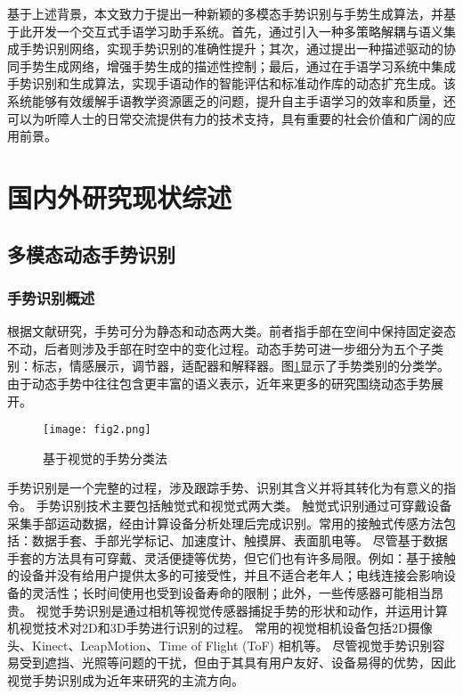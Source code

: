 基于上述背景，本文致力于提出一种新颖的多模态手势识别与手势生成算法，并基于此开发一个交互式手语学习助手系统。首先，通过引入一种多策略解耦与语义集成手势识别网络，实现手势识别的准确性提升；其次，通过提出一种描述驱动的协同手势生成网络，增强手势生成的描述性控制；最后，通过在手语学习系统中集成手势识别和生成算法，实现手语动作的智能评估和标准动作库的动态扩充生成。该系统能够有效缓解手语教学资源匮乏的问题，提升自主手语学习的效率和质量，还可以为听障人士的日常交流提供有力的技术支持，具有重要的社会价值和广阔的应用前景。



\section{国内外研究现状综述}
\subsection{多模态动态手势识别}
\subsubsection{手势识别概述}
根据文献研究\cite{kaaniche2009gesture, rautaray2015vision}，手势可分为静态和动态两大类。前者指手部在空间中保持固定姿态不动，后者则涉及手部在时空中的变化过程。动态手势可进一步细分为五个子类别\cite{ottenheimer2018anthropology}：标志，情感展示，调节器，适配器和解释器。图\ref{fig:gesture_taxonomies}显示了手势类别的分类学。由于动态手势中往往包含更丰富的语义表示，近年来更多的研究围绕动态手势展开。
\begin{figure}
  \centering
  \texttt{[image: fig2.png]}
  \caption{基于视觉的手势分类法\cite{rautaray2015vision}}
  \label{fig:gesture_taxonomies}
\end{figure}

手势识别是一个完整的过程，涉及跟踪手势、识别其含义并将其转化为有意义的指令\cite{rautaray2015vision}。
手势识别技术主要包括触觉式和视觉式两大类\cite{oudah2020hand,rautaray2015vision}。
触觉式识别通过可穿戴设备采集手部运动数据，经由计算设备分析处理后完成识别。常用的接触式传感方法包括：数据手套、手部光学标记、加速度计、触摸屏、表面肌电等\cite{oudah2020hand}。
尽管基于数据手套的方法具有可穿戴、灵活便捷等优势，但它们也有许多局限。例如：基于接触的设备并没有给用户提供太多的可接受性\cite{rautaray2015vision}，并且不适合老年人；电线连接会影响设备的灵活性；长时间使用也受到设备寿命的限制；此外，一些传感器可能相当昂贵\cite{oudah2020hand}。
视觉手势识别是通过相机等视觉传感器捕捉手势的形状和动作，并运用计算机视觉技术对2D和3D手势进行识别的过程。
常用的视觉相机设备包括2D摄像头、Kinect、LeapMotion、Time of Flight (ToF) 相机等\cite{基于视觉的动态手势识别研究综述}。
尽管视觉手势识别容易受到遮挡、光照等问题的干扰，但由于其具有用户友好、设备易得的优势，因此视觉手势识别成为近年来研究的主流方向。

